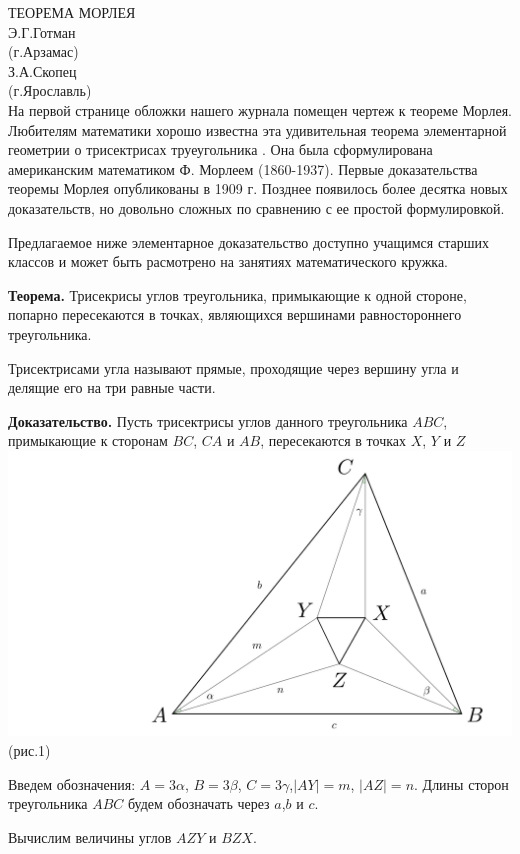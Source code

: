 \documentclass{article}
\begin{document}
\pagestyle{fancy}
ТЕОРЕМА МОРЛЕЯ
\\Э.Г.Готман
\\(г.Арзамас)
\\З.А.Скопец
\\(г.Ярославль)
\\На первой странице обложки нашего журнала помещен чертеж к теореме Морлея. Любителям математики хорошо известна эта удивительная теорема элементарной геометрии о трисектрисах труеугольника . Она была сформулирована американским математиком Ф. Морлеем (1860-1937). Первые доказательства теоремы Морлея опубликованы в 1909 г. Позднее появилось более десятка новых доказательств, но довольно сложных по сравнению с ее простой формулировкой.
\par Предлагаемое ниже элементарное доказательство доступно учащимся старших классов и может быть расмотрено на занятиях математического кружка. 
\par \textbf{Теорема.}  Трисекрисы углов треугольника, примыкающие к одной стороне, попарно пересекаются в точках, являющихся вершинами равностороннего треугольника. 
\par Трисектрисами угла называют прямые, проходящие через вершину угла и делящие его на три равные части. 
\par \textbf{Доказательство.} Пусть трисектрисы углов данного треугольника $ABC$, примыкающие к сторонам $BC$, $CA$ и $AB$, пересекаются в точках $X$, $Y$ и $Z$
\\
\includegraphics[scale=0.25]{morley1.png}(рис.1)
\\
\par Введем обозначения: $A=3\alpha$, $B=3\beta$, $C=3\gamma$,$ \mid AY \mid=m$, $\mid AZ\mid=n$. Длины сторон треугольника $ABC$ будем обозначать через $a$,$b$ и $c$.
\par Вычислим величины углов $AZY$ и $BZX$. 
\end{document}
